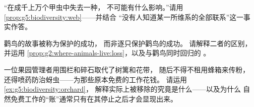\begin{exercise}[$\star\star$]\label{exo:g5:biodiversity:9}
“在成千上万个甲虫中失去一种，
不可能有什么影响。”请用
\cref{prop:g5:biodiversity:web}——并结合
“没有人知道某一所维系的全部联系”这一事实作答。
\end{exercise}

\begin{exercise}[$\star\star$]\label{exo:g5:biodiversity:10}
鹳鸟的故事被称为\emph{}保护的成功，
而非逐只保护鹳鸟的成功。
请解释二者的区别，并运用
\cref{prop:g2:where-animals-live:loss}，以及与鹳鸟同时回归的
。
\end{exercise}

\begin{exercise}[$\star\star\star$]\label{exo:g5:biodiversity:11}
一位果园管理者用围栏和碎石取代了树篱和花带，
随后不得不租用蜂箱来传粉，
还得喷药防治蚜虫——为那些原本免费的工作花钱。
请运用\cref{ex:g5:biodiversity:orchard}，
解释实际上被移除的究竟是什么——以及为什么
自然免费工作的“账”通常只有在其停止之后才会显现出来。
\end{exercise}
